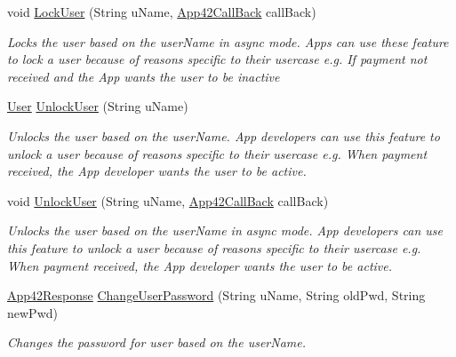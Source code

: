 \begin{DoxyCompactItemize}
void \hyperlink{classcom_1_1shephertz_1_1app42_1_1paas_1_1sdk_1_1csharp_1_1user_1_1_user_service_a51cab7b8950b6697f70e2ea2f5010a0f}{Lock\+User} (String u\+Name, \hyperlink{interfacecom_1_1shephertz_1_1app42_1_1paas_1_1sdk_1_1csharp_1_1_app42_call_back}{App42\+Call\+Back} call\+Back)
\begin{DoxyCompactList}\small\item\em Locks the user based on the user\+Name in async mode. Apps can use these feature to lock a user because of reasons specific to their usercase e.\+g. If payment not received and the App wants the user to be inactive \end{DoxyCompactList}\item 
\hyperlink{classcom_1_1shephertz_1_1app42_1_1paas_1_1sdk_1_1csharp_1_1user_1_1_user}{User} \hyperlink{classcom_1_1shephertz_1_1app42_1_1paas_1_1sdk_1_1csharp_1_1user_1_1_user_service_aec18acf33ad014b441144b4e5a849778}{Unlock\+User} (String u\+Name)
\begin{DoxyCompactList}\small\item\em Unlocks the user based on the user\+Name. App developers can use this feature to unlock a user because of reasons specific to their usercase e.\+g. When payment received, the App developer wants the user to be active. \end{DoxyCompactList}\item 
void \hyperlink{classcom_1_1shephertz_1_1app42_1_1paas_1_1sdk_1_1csharp_1_1user_1_1_user_service_a8f00c5d2d1bf0a244b39f5ec88711bb1}{Unlock\+User} (String u\+Name, \hyperlink{interfacecom_1_1shephertz_1_1app42_1_1paas_1_1sdk_1_1csharp_1_1_app42_call_back}{App42\+Call\+Back} call\+Back)
\begin{DoxyCompactList}\small\item\em Unlocks the user based on the user\+Name in async mode. App developers can use this feature to unlock a user because of reasons specific to their usercase e.\+g. When payment received, the App developer wants the user to be active. \end{DoxyCompactList}\item 
\hyperlink{classcom_1_1shephertz_1_1app42_1_1paas_1_1sdk_1_1csharp_1_1_app42_response}{App42\+Response} \hyperlink{classcom_1_1shephertz_1_1app42_1_1paas_1_1sdk_1_1csharp_1_1user_1_1_user_service_a653cb5575d2109374d0901199840d893}{Change\+User\+Password} (String u\+Name, String old\+Pwd, String new\+Pwd)
\begin{DoxyCompactList}\small\item\em Changes the password for user based on the user\+Name. \end{DoxyCompactList}\item 

\end{DoxyCompactItemize}

